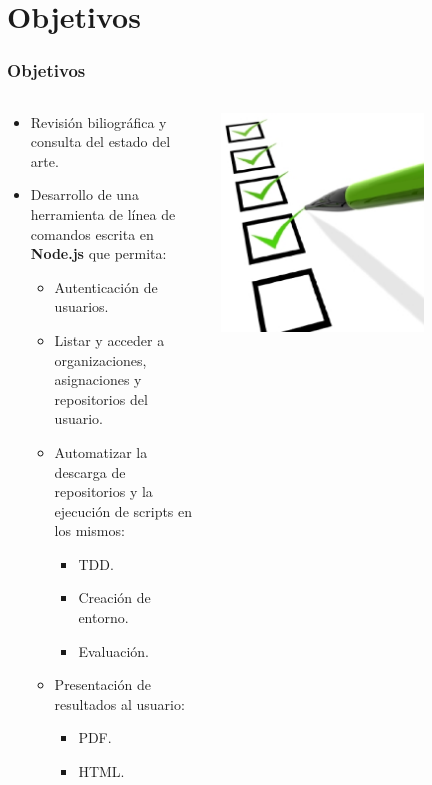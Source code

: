 \documentclass{beamer}
\begin{document}
\section{Objetivos}
\begin{frame}
  \frametitle{Objetivos}
  
  \begin{columns}
    \begin{column}{9cm}
      \begin{itemize}
        \item Revisión biliográfica y consulta del estado del arte.
        \newline
        \item Desarrollo de una herramienta de línea de comandos escrita en {\bfseries Node.js} que permita: 
        \begin{itemize}
          \item Autenticación de usuarios.
          \item Listar y acceder a organizaciones, asignaciones y repositorios del usuario.
          \item Automatizar la descarga de repositorios y la ejecución de scripts en los mismos:
          \begin{itemize}
             \item TDD.
             \item Creación de entorno.
             \item Evaluación.
          \end{itemize}
          \item Presentación de resultados al usuario:
          \begin{itemize}
             \item PDF.
             \item HTML.
          \end{itemize}
        \end{itemize}
      \end{itemize}
    \end{column}
    \begin{column}{5cm}
      \includegraphics[width=0.7\textwidth]{images/checklist.eps}

\end{column}
\end{columns}
\end{frame}
\end{document}
